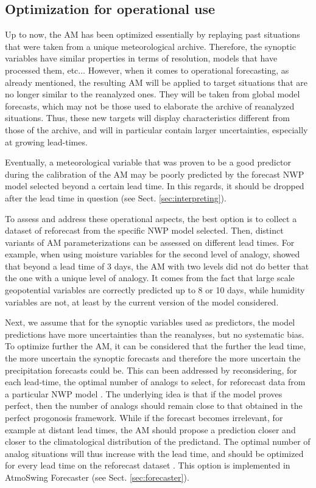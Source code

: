 \documentclass[review]{elsarticle}
\begin{document}
\subsection{Optimization for operational use}
\label{sec:optimization-operational}

Up to now, the AM has been optimized essentially by replaying past situations that were taken from a unique meteorological archive. Therefore, the synoptic variables have similar properties in terms of resolution, models that have processed them, etc... However, when it comes to operational forecasting, as already mentioned, the resulting AM will be applied to target situations that are no longer similar to the reanalyzed ones. They will be taken from global model forecasts, which may not be those used to elaborate the archive of reanalyzed situations. Thus, these new targets will display characteristics different from those of the archive, and will in particular contain larger uncertainties, especially at growing lead-times.

Eventually, a meteorological variable that was proven to be a good predictor during the calibration of the AM may be poorly predicted by the forecast NWP model selected beyond a certain lead time. In this regards, it should be dropped after the lead time in question (see Sect. \ref{sec:interpreting}).

To assess and address these operational aspects, the best option is to collect a dataset of reforecast from the specific NWP model selected. Then, distinct variants of AM parameterizations can be assessed on different lead times. For example, when using moisture variables for the second level of analogy, \citet{Thevenot2004} showed that beyond a lead time of 3 days, the AM with two levels did not do better that the one with a unique level of analogy. It comes from the fact that large scale geopotential variables are correctly predicted up to 8 or 10 days, while humidity variables are not, at least by the current version of the model considered.

Next, we assume that for the synoptic variables used as predictors, the model predictions have more uncertainties than the reanalyses, but no systematic bias. To optimize further the AM, it can be considered that the further the lead time, the more uncertain the synoptic forecasts and therefore the more uncertain the precipitation forecasts could be. This can been addressed by reconsidering, for each lead-time, the optimal number of analogs to select, for reforecast data from a particular NWP model \citep{Thevenot2004}. The underlying idea is that if the model proves perfect, then the number of analogs should remain close to that obtained in the perfect progonosis framework. While if the forecast becomes irrelevant, for example at distant lead times, the AM should propose a prediction closer and closer to the climatological distribution of the predictand. The optimal number of analog situations will thus increase with the lead time, and should be optimized for every lead time on the reforecast dataset \citep[see][for the details]{Thevenot2004}. This option is implemented in AtmoSwing Forecaster (see Sect. \ref{sec:forecaster}).
\end{document}
